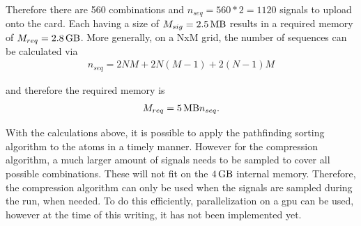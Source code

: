 Therefore there are 560 combinations and $n_{seq} = 560*2=1120$ signals to upload onto the card. Each having a size of $M_{sig} = \SI{2.5}{\mega\byte}$ results in a required memory of $M_{req}=\SI{2.8}{\giga\byte}$. More generally, on a NxM grid, the number of sequences can be calculated via
\begin{align}
	n_{seq} = 2 N M + 2 N (M-1) + 2 (N-1) M
\end{align}

and therefore the required memory is
\begin{align}
	M_{req} = \SI{5}{\mega\byte} n_{seq}.
\end{align}

With the calculations above, it is possible to apply the pathfinding sorting algorithm to the atoms in a timely manner. However for the compression algorithm, a much larger amount of signals needs to be sampled to cover all possible combinations. These will not fit on the $\SI{4}{\giga\byte}$ internal memory. Therefore, the compression algorithm can only be used when the signals are sampled during the run, when needed. To do this efficiently, parallelization on a \ac{gpu} can be used, however at the time of this writing, it has not been implemented yet.

